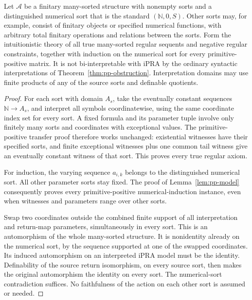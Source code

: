 \begin{corollary}
\label{cor:pp-many-sorted}
Let $\mathcal A$ be a finitary many-sorted structure with nonempty
sorts and a distinguished numerical sort that is the standard
$(\mathbb N,0,S)$.  Other sorts may, for example, consist of finitary
objects or specified numerical functions, with arbitrary total finitary
operations and relations between the sorts.  Form the intuitionistic
theory of all true many-sorted regular sequents and negative regular
constraints, together with induction on the numerical sort for every
primitive-positive matrix.  It is not bi-interpretable with iPRA by
the ordinary syntactic interpretations of
Theorem~\ref{thm:pp-obstruction}.  Interpretation domains may use finite
products of any of the source sorts and definable quotients.
\end{corollary}
\begin{proof}
For each sort with domain $A_s$, take the eventually constant sequences
$\mathbb N\to A_s$, and interpret all symbols coordinatewise, using
the same coordinate index set for every sort.  A fixed formula and its
parameter tuple involve only finitely many sorts and coordinates with
exceptional values.  The primitive-positive transfer proof therefore
works unchanged: existential witnesses have their specified sorts,
and finite exceptional witnesses plus one common tail witness give
an eventually constant witness of that sort.  This proves every true
regular axiom.

For induction, the varying sequence $a_{i,k}$ belongs to the
distinguished numerical sort.  All other parameter sorts stay fixed.
The proof of Lemma~\ref{lem:pp-model} consequently proves every
primitive-positive numerical-induction instance, even when witnesses
and parameters range over other sorts.

Swap two coordinates outside the combined finite support of all
interpretation and return-map parameters, simultaneously in every
sort.  This is an automorphism of the whole many-sorted structure.
It is nonidentity already on the numerical sort, by the sequence
supported at one of the swapped coordinates.  Its induced
automorphism on an interpreted iPRA model must be the identity.
Definability of the source return isomorphism, on every source sort,
then makes the original automorphism the identity on every sort.
The numerical-sort contradiction suffices.  No faithfulness of the
action on each other sort is assumed or needed.
\end{proof}


